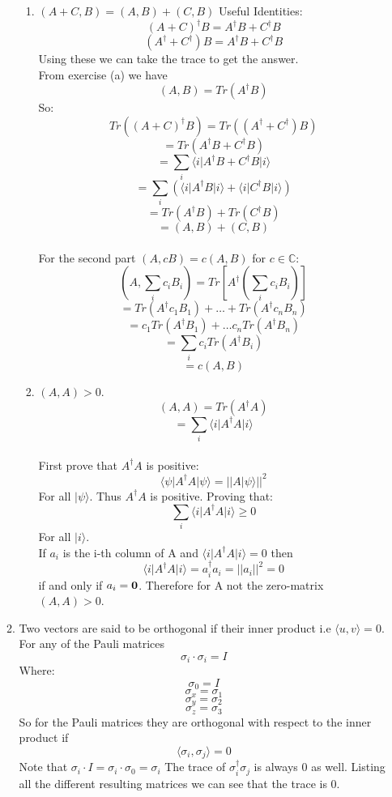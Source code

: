 \documentclass[12pt]{article}
\newcommand{\ket}[1]{\vert{#1}\rangle}
\newcommand{\bra}[1]{\langle{#1}\vert}
\begin{document}
\begin{enumerate}
\begin{enumerate}
\begin{enumerate}
        \item $(A+C,B)=(A,B) + (C,B)$
        Useful Identities:
        $$ (A+C)^\dagger B = A^\dagger B + C^\dagger B $$
        $$ (A^\dagger + C^\dagger) B = A^\dagger B + C^\dagger B $$
        Using these we can take the trace to get the answer. 
        \\ From exercise (a) we have 
        $$ (A,B) = Tr(A^\dagger B) $$ 
        So:
        $$ Tr((A+C)^\dagger B) = Tr((A^\dagger + C^\dagger)B) $$
        $$ = Tr(A^\dagger B + C^\dagger B) $$ 
        $$ = \sum_i \bra{i}A^\dagger B + C^\dagger B \ket{i} $$
        $$ = \sum_i (\bra{i}A^\dagger B \ket{i} + \bra{i}C^\dagger B\ket{i}) $$
        $$ =Tr(A^\dagger B) + Tr(C^\dagger B) $$
        $$ = (A,B) + (C,B) $$
        \\ For the second part $(A,cB) = c(A,B) $ for $c \in \mathbb{C}$:
        $$ (A, \sum_i c_i B_i ) = Tr[A^\dagger (\sum_i c_i B_i)] $$
        $$ = Tr(A^\dagger c_1 B_1) + \ldots + Tr(A^\dagger c_n B_n) $$
        $$ = c_1 Tr(A^\dagger B_1) + \ldots c_n Tr(A^\dagger B_n) $$
        $$ =\sum_i c_i Tr(A^\dagger B_i) $$
        $$ =c(A,B) $$
        \item $(A,A) > 0$. 
        $$ (A,A) = Tr(A^\dagger A) $$
        $$ = \sum_i \bra{i}A^\dagger A \ket{i} $$
        \\ First prove that $A^\dagger A$ is positive:
        $$ \bra{\psi}A^\dagger A \ket{\psi} = || A \ket{\psi} || ^2 $$ 
        For all $\ket{\psi}$. Thus $A^\dagger A$ is positive. Proving that:  
        $$ \sum_i \bra{i}A^\dagger A \ket{i} \geq 0 $$ For all $\ket{i}$.
        \\ If $a_i$ is the i-th column of A and $\bra{i}A^\dagger A \ket{i} = 0$ then 
        $$ \bra{i}A^\dagger A \ket{i} = a_i^\dagger a_i = ||a_i || ^2 =0 $$ if and only if $a_i = \bf{0}$.
        Therefore for A not the zero-matrix $(A,A) > 0$. 
    \end{enumerate}
    \item Two vectors are said to be orthogonal if their inner product i.e $\langle u,v \rangle= 0 $. 
    \\ For any of the Pauli matrices 
    $$ \sigma_i \cdot \sigma_i = I  $$
    Where:
    $$ \sigma_0 = I $$
    $$ \sigma_x = \sigma_1 $$
    $$ \sigma_y = \sigma_2 $$
    $$ \sigma_z = \sigma_3 $$
    So for the Pauli matrices they are orthogonal with respect to the inner product if 
    $$ \langle \sigma_i, \sigma_j \rangle =0 $$
    Note that $\sigma_i \cdot I = \sigma_i \cdot \sigma_0 = \sigma_i $
    The trace of $\sigma_i^\dagger \sigma_j$ is always 0 as well. Listing all the different resulting matrices we can see that the trace is 0.

\end{enumerate}
\end{enumerate}
\end{document}
